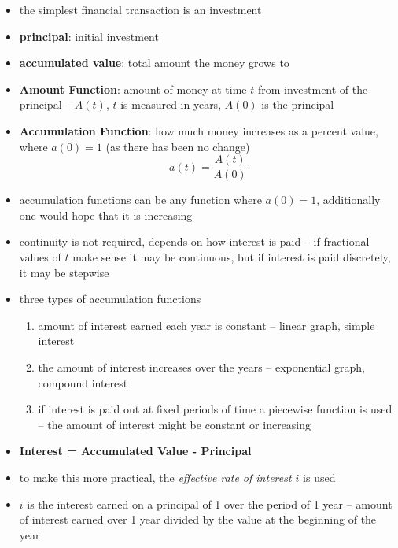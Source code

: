 \documentclass[../00_main.tex]{subfiles}
\begin{document}
\begin{itemize}
    \item the simplest financial transaction is an investment
    \item \textbf{principal}: initial investment
    \item \textbf{accumulated value}: total amount the money grows to
    \item \textbf{Amount Function}: amount of money at time $t$ from investment
        of the principal -- $A(t)$, $t$ is measured in years, $A(0)$ is the
        principal
    \item \textbf{Accumulation Function}: how much money increases as a percent
        value, where $a(0)=1$ (as there has been no change)
        \begin{equation}\nonumber
            a(t) = \frac{A(t)}{A(0)}
        \end{equation}
    \item accumulation functions can be any function where $a(0)=1$,
        additionally one would hope that it is increasing
    \item continuity is not required, depends on how interest is paid -- if
        fractional values of $t$ make sense it may be continuous, but if
        interest is paid discretely, it may be stepwise
    \item three types of accumulation functions
        \begin{enumerate}
            \item amount of interest earned each year is constant --
                linear graph, simple interest 
            \item the amount of interest increases over the years --
                exponential graph, compound interest
            \item if interest is paid out at fixed periods of time a piecewise
                function is used -- the amount of interest might be constant or
                increasing
        \end{enumerate}
    \item \textbf{Interest = Accumulated Value - Principal}
    \item to make this more practical, the \textit{effective rate of interest
        $i$} is used
    \item $i$ is the interest earned on a principal of 1 over the period of
        1 year -- amount of interest earned over 1 year divided by the value at
        the beginning of the year
        \begin{equation}\nonumber

\end{equation}
\end{itemize}
\end{document}
